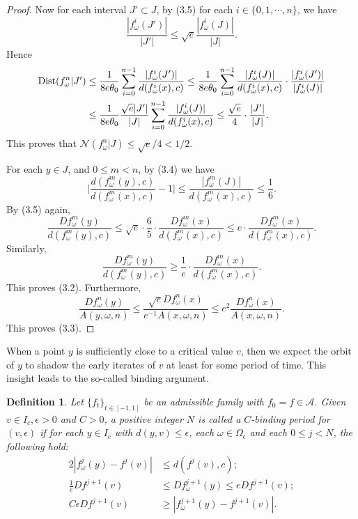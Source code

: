 \documentclass[11pt,oneside]{article}
\newtheorem{definition}{Definition}[section]
\theoremstyle{plain}
\numberwithin{equation}{section}
\numberwithin{figure}{section}
\numberwithin{table}{section}
\begin{document}
\begin{proof}
Now for each interval $J' \subset J$, by (3.5) for each $i \in \{0, 1, \cdots, n\}$, we have
\[
\frac{|f_{\omega}^i(J')|}{|J'|} \leq \sqrt e \frac{|f_{\omega}^i(J)|}{|J|}.
\]
Hence 
\begin{align*}
{\rm Dist}(f_{\omega}^n | J') & \leq \frac{1}{8e \theta_0} \sum_{i=0}^{n-1} \frac{|f_{\omega}^i(J')|}{d(f_{\omega}^i(x), c)} \leq \frac{1}{8e \theta_0} \sum_{i=0}^{n-1} \frac{|f_{\omega}^i(J)|}{d(f_{\omega}^i(x), c)} \cdot \frac{|f_{\omega}^i(J')|}{|f_{\omega}^i(J)|}\\
& \leq \frac{1}{8e \theta_0} \frac{\sqrt e|J'|}{|J|} \sum_{i=0}^{n-1} \frac{|f_{\omega}^i(J)|}{d(f_{\omega}^i(x), c)} \leq \frac{\sqrt e}{4} \cdot \frac{|J'|}{|J|}.
\end{align*}
This proves that $\mathcal N(f_{\omega}^n | J )\leq \sqrt e/4 < 1/2$. 


For each $y \in J$, and $0 \leq m <n$, by (3.4) we have
\[
\bigg| \frac{d(f_{\omega}^m(y), c)}{d(f_{\omega}^m(x), c)} - 1 \bigg| \leq \frac{|f_{\omega}^m(J)|}{d(f_{\omega}^m(x), c)} \leq \frac{1}{6}.
\]
By (3.5) again, 
\[
\frac{D f_{\omega}^m(y)}{d(f_{\omega}^m(y), c)} \leq \sqrt e \cdot \frac{6}{5} \cdot \frac{D f_{\omega}^m(x)}{d(f_{\omega}^m(x), c)} \leq e \cdot \frac{D f_{\omega}^m(x)}{d(f_{\omega}^m(x), c)}.
\]
Similarly,
\[
\frac{D f_{\omega}^m(y)}{d(f_{\omega}^m(y), c)} \geq \frac{1}{e} \cdot \frac{D f_{\omega}^m(x)}{d(f_{\omega}^m(x), c)}.
\]
This proves (3.2). Furthermore, 
\[
 \frac{Df_{\omega}^n(y)}{A(y, \omega, n)} \leq \frac{\sqrt e Df_{\omega}^n(x)}{e^{-1} A(x, \omega, n)} \leq e^2 \frac{ Df_{\omega}^n(x)}{ A(x, \omega, n)}.
\]
This proves (3.3).

\end{proof}
\fi


When a point $y$ is sufficiently close to a critical value $v$, then we expect the orbit of $y$ to shadow the early iterates of $v$ at least for some period of time. This insight leads to the so-called binding argument.


\begin{definition}
Let $\{f_t \}_{t \in [-1, 1]} $ be an admissible family with $f_0 =f \in \mathcal A$. Given $v \in I_c, \epsilon >0$ and $C > 0$, a positive integer $N$ is called a $C$-binding period for $(v, \epsilon)$ if for each $y \in I_c$ with $d(y, v)\leq \epsilon$, each $\omega \in \Omega_{\epsilon}$ and each $0 \leq j <N$, the following hold:
\begin{align}
2|f_{\omega}^j (y) - f^j(v)|& \leq d(f^j(v), c);\\
\frac{1}{e} Df^{j+1}(v) & \leq D f_{\omega}^{j+1}(y)  \leq e Df^{j+1}(v);\\
C\epsilon Df^{j+1}(v) & \geq |f_{\omega}^{j+1}(y) - f^{j+1}(v) |.
\end{align}

\end{definition}
\end{document}
